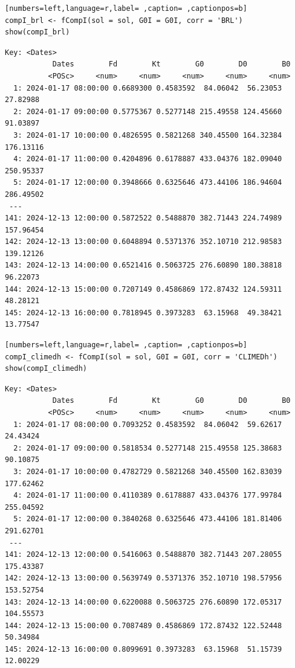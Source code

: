 \begin{itemize}
\begin{lstlisting}[numbers=left,language=r,label= ,caption= ,captionpos=b]
compI_brl <- fCompI(sol = sol, G0I = G0I, corr = 'BRL')
show(compI_brl)
\end{lstlisting}

\begin{verbatim}
Key: <Dates>
		   Dates        Fd        Kt        G0        D0        B0
		  <POSc>     <num>     <num>     <num>     <num>     <num>
  1: 2024-01-17 08:00:00 0.6689300 0.4583592  84.06042  56.23053  27.82988
  2: 2024-01-17 09:00:00 0.5775367 0.5277148 215.49558 124.45660  91.03897
  3: 2024-01-17 10:00:00 0.4826595 0.5821268 340.45500 164.32384 176.13116
  4: 2024-01-17 11:00:00 0.4204896 0.6178887 433.04376 182.09040 250.95337
  5: 2024-01-17 12:00:00 0.3948666 0.6325646 473.44106 186.94604 286.49502
 ---                                                                      
141: 2024-12-13 12:00:00 0.5872522 0.5488870 382.71443 224.74989 157.96454
142: 2024-12-13 13:00:00 0.6048894 0.5371376 352.10710 212.98583 139.12126
143: 2024-12-13 14:00:00 0.6521416 0.5063725 276.60890 180.38818  96.22073
144: 2024-12-13 15:00:00 0.7207149 0.4586869 172.87432 124.59311  48.28121
145: 2024-12-13 16:00:00 0.7818945 0.3973283  63.15968  49.38421  13.77547
\end{verbatim}

\begin{lstlisting}[numbers=left,language=r,label= ,caption= ,captionpos=b]
compI_climedh <- fCompI(sol = sol, G0I = G0I, corr = 'CLIMEDh')
show(compI_climedh)
\end{lstlisting}

\begin{verbatim}
Key: <Dates>
		   Dates        Fd        Kt        G0        D0        B0
		  <POSc>     <num>     <num>     <num>     <num>     <num>
  1: 2024-01-17 08:00:00 0.7093252 0.4583592  84.06042  59.62617  24.43424
  2: 2024-01-17 09:00:00 0.5818534 0.5277148 215.49558 125.38683  90.10875
  3: 2024-01-17 10:00:00 0.4782729 0.5821268 340.45500 162.83039 177.62462
  4: 2024-01-17 11:00:00 0.4110389 0.6178887 433.04376 177.99784 255.04592
  5: 2024-01-17 12:00:00 0.3840268 0.6325646 473.44106 181.81406 291.62701
 ---                                                                      
141: 2024-12-13 12:00:00 0.5416063 0.5488870 382.71443 207.28055 175.43387
142: 2024-12-13 13:00:00 0.5639749 0.5371376 352.10710 198.57956 153.52754
143: 2024-12-13 14:00:00 0.6220088 0.5063725 276.60890 172.05317 104.55573
144: 2024-12-13 15:00:00 0.7087489 0.4586869 172.87432 122.52448  50.34984
145: 2024-12-13 16:00:00 0.8099691 0.3973283  63.15968  51.15739  12.00229
\end{verbatim}


\end{itemize}
